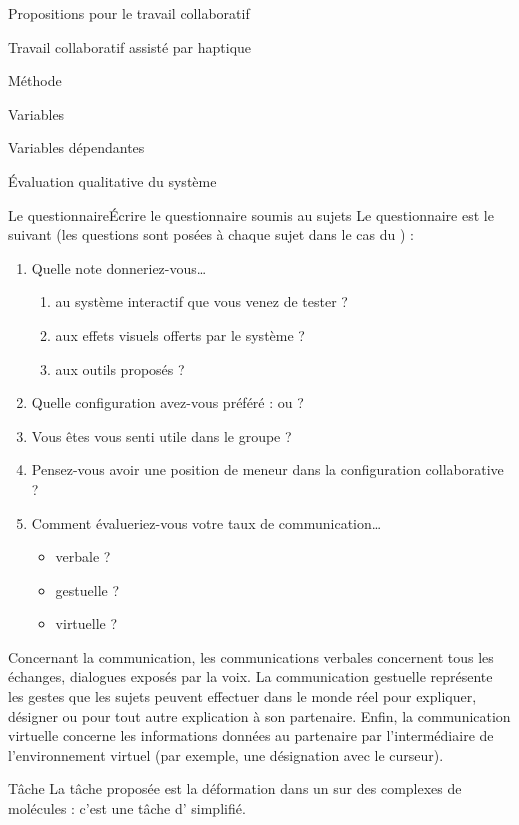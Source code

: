 \documentclass[myfrancais]{mythesis}
\begin{document}
\begin{mypart}{Propositions pour le travail collaboratif}
\begin{mychapter}{Travail collaboratif assisté par haptique}
\begin{mysection}{Méthode}
\begin{mysubsection}{Variables}
\begin{mysubsubsection}{Variables dépendantes}
\begin{myparagraph}{ Évaluation qualitative du système}
							\begin{myTodo}{Le questionnaire}{Écrire le questionnaire soumis au sujets}
								Le questionnaire est le suivant (les questions sont posées à chaque sujet dans le cas du ) :
								\begin{enumerate}
									\item Quelle note donneriez-vous\dots{}
										\begin{enumerate}
											\item au système interactif que vous venez de tester ?
											\item aux effets visuels offerts par le système ?
											\item aux outils proposés ?
										\end{enumerate}
									\item Quelle configuration avez-vous préféré :  ou  ?
									\item Vous êtes vous senti utile dans le groupe ?
									\item Pensez-vous avoir une position de meneur dans la configuration collaborative ?
									\item Comment évalueriez-vous votre taux de communication\dots{}
										\begin{itemize}
											\item verbale ?
											\item gestuelle ?
											\item virtuelle ?
										\end{itemize}
								\end{enumerate}
							\end{myTodo}

							Concernant la communication, les communications verbales concernent tous les échanges, dialogues exposés par la voix.
							La communication gestuelle représente les gestes que les sujets peuvent effectuer dans le monde réel pour expliquer, désigner ou pour tout autre explication à son partenaire.
							Enfin, la communication virtuelle concerne les informations données au partenaire par l'intermédiaire de l'environnement virtuel (par exemple, une désignation avec le curseur).
						\end{myparagraph}
					\end{mysubsubsection}
				\end{mysubsection}
				\begin{mysubsection}[sse-exp4-Tache]{Tâche}
					La tâche proposée est la déformation dans un  sur des complexes de molécules : c'est une tâche d' simplifié.


\end{mysubsection}
\end{mysection}
\end{mychapter}
\end{mypart}
\end{document}
